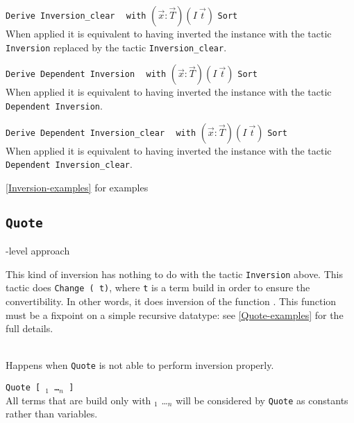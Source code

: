 \begin{Variants}
\item \texttt{Derive Inversion\_clear} \ident~ \texttt{with}
  $(\vec{x}:\vec{T})(I~\vec{t})$ \texttt{Sort} \sort~ \\ 
  When applied it is equivalent to having
  inverted the instance with the tactic \texttt{Inversion}
  replaced by the tactic \texttt{Inversion\_clear}.
\item \texttt{Derive Dependent Inversion} \ident~ \texttt{with}
  $(\vec{x}:\vec{T})(I~\vec{t})$ \texttt{Sort} \sort~\\
  When applied it is equivalent to having
  inverted the instance with the tactic \texttt{Dependent Inversion}.
\item \texttt{Derive Dependent Inversion\_clear} \ident~ \texttt{with}
  $(\vec{x}:\vec{T})(I~\vec{t})$ \texttt{Sort} \sort~\\
  When applied it is equivalent to having
  inverted the instance with the tactic \texttt{Dependent Inversion\_clear}.
\end{Variants}

\SeeAlso \ref{Inversion-examples} for examples

\subsection{\texttt{Quote} \ident}
-level approach

This kind of inversion has nothing to do with the tactic
\texttt{Inversion} above. This tactic does \texttt{Change (\ident\
  t)}, where \texttt{t} is a term build in order to ensure the
convertibility. In other words, it does inversion of the function
\ident. This function must be a fixpoint on a simple recursive
datatype: see \ref{Quote-examples} for the full details.

\begin{ErrMsgs}
\item {}\\
  Happens when \texttt{Quote} is not able to perform inversion properly.
\end{ErrMsgs}

\begin{Variants}
\item \texttt{Quote {\ident} [ \ident$_1$ \dots \ident$_n$ ]}\\
  All terms that are build only with \ident$_1$ \dots \ident$_n$ will be
  considered by \texttt{Quote} as constants rather than variables.
\end{Variants}

